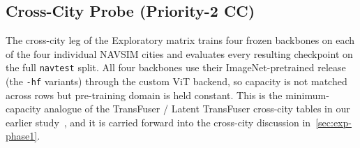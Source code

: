 \subsection{Cross-City Probe (Priority-2 CC)}
\label{sec:exp-phase0-cc}

The cross-city leg of the Exploratory matrix trains four frozen backbones on each of the four individual NAVSIM cities and evaluates every resulting checkpoint on the full \texttt{navtest} split. All four backbones use their ImageNet-pretrained release (the \texttt{-hf} variants) through the custom ViT backend, so capacity is not matched across rows but pre-training domain is held constant. This is the minimum-capacity analogue of the TransFuser / Latent TransFuser cross-city tables in our earlier study~\cite{naeinian-cross-city-2026}, and it is carried forward into the cross-city discussion in~\ref{sec:exp-phase1}.

